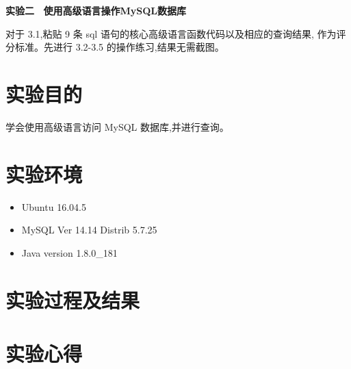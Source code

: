 \documentclass{ML}
\begin{document}
\maketitle

\newpage

\begin{center}
    \textbf{ 实验二 \ 使用高级语言操作MySQL数据库}
\end{center}

对于 3.1,粘贴 9 条 sql 语句的核心高级语言函数代码以及相应的查询结果,
作为评分标准。先进行 3.2-3.5 的操作练习,结果无需截图。

\section{实验目的}
学会使用高级语言访问 MySQL 数据库,并进行查询。
\section{实验环境}
\begin{itemize}
    \item Ubuntu 16.04.5
    \item MySQL Ver 14.14 Distrib 5.7.25
    \item Java version 1.8.0\_181
\end{itemize}
\section{实验过程及结果}

\section{实验心得}


\end{document}
